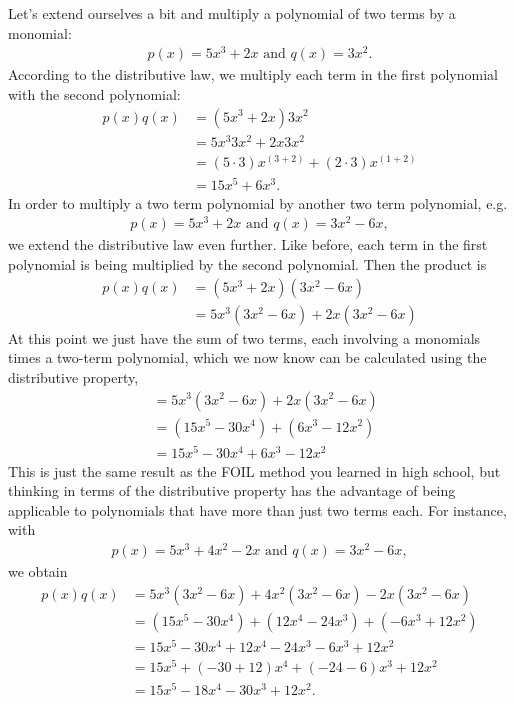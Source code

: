 Let's extend ourselves a bit and multiply a polynomial of two terms by a monomial:
\begin{align*} 
p(x)  = 5x^3 + 2x \text{ and }
q(x)  = 3x^2.
\end{align*}
According to the distributive law, we multiply each term in the first polynomial with the second polynomial:
\begin{align*}
p(x)  q(x) 
& = ( 5x^3 +2x)  3x^2 \\
&= 5x^3 3x^2 + 2x 3x^2\\
& = (5 \cdot 3)x^{(3 + 2)} + (2 \cdot 3)x^{(1+2)}\\ 
& = 15x^5 + 6x^3.
\end{align*}
In order to  multiply a two term polynomial by another two term polynomial, e.g.
\begin{align*} 
p(x)  = 5x^3 + 2x \text{ and } q(x)  = 3x^2 - 6x,
\end{align*}
we extend the distributive law even further.  Like before, each term in the first polynomial is being multiplied by the second polynomial.
Then the product is
\begin{align*}
p(x)  q(x) 
& = ( 5x^3 +2x)  (3x^2 - 6x) \\
& = 5x^3 (3x^2 - 6x) +2x(3x^2 - 6x) 
\end{align*}
At this point we just have the sum of two terms, each involving a monomials times a two-term polynomial, which we now know can be calculated using the distributive property,
\begin{align*}
& = 5x^3 (3x^2 - 6x) +2x(3x^2 - 6x) \\
& = (15x^5 -30x^4) + (6x^3-12x^2)\\
&= 15x^5 - 30x^4 + 6x^3 - 12x^2
\end{align*}
This is just the same result as the FOIL method you learned in high school, but thinking in terms of the distributive property has the advantage of being applicable to polynomials that have more than just two terms each.  
For instance, with
\begin{align*}
p(x)  = 5x^3 + 4x^2 - 2x \text{ and } q(x)  = 3x^2 - 6x,
\end{align*}
we obtain
\begin{align*}
p(x) q(x)
& = 5x^3 (3x^2 - 6x) +4x^2(3x^2 - 6x)-2x(3x^2 - 6x) \\
& = (15x^5 -30x^4) + (12x^4 - 24x^3)  + (-6x^3 + 12x^2)\\
&= 15x^5 - 30x^4 + 12x^4-24x^3 - 6x^3 + 12x^2\\
&= 15x^5 + (-30+12)x^4 + (-24-6)x^3 +12x^2 \\
&= 15x^5 - 18x^4 - 30x^3 +12x^2.
\end{align*}

